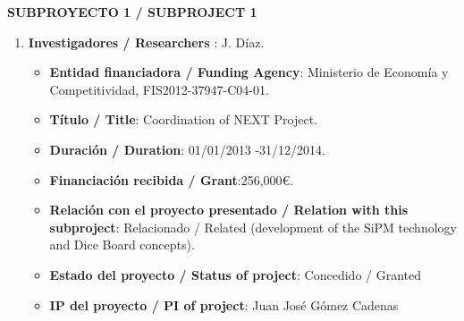\noindent\textbf{SUBPROYECTO 1 / SUBPROJECT 1}

\begin{enumerate}
\item {\bf Investigadores / Researchers }: J. Díaz.
\begin{itemize}
\item {\bf Entidad financiadora / Funding Agency}:  Ministerio de Econom\'ia y Competitividad, FIS2012-37947-C04-01.
\item {\bf Título / Title}:  Coordination of NEXT Project.
\item {\bf Duración / Duration}: 01/01/2013 -31/12/2014. 
\item {\bf Financiación recibida / Grant}:256,000\euro. 
\item {\bf Relación con el proyecto presentado / Relation with this subproject}: Relacionado / Related (development of the SiPM technology and Dice Board concepts). 
\item {\bf Estado del proyecto / Status of project}: Concedido / Granted
\item {\bf IP del proyecto / PI of project}: Juan José Gómez Cadenas 
\end{itemize}
\end{enumerate}
